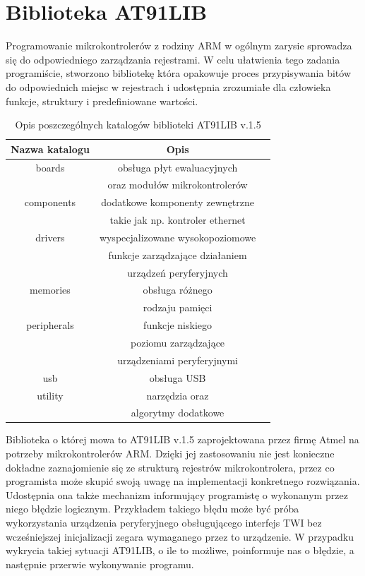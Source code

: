 \section{Biblioteka AT91LIB}
\label{sec:at91lib}
Programowanie mikrokontrolerów z rodziny ARM w ogólnym zarysie sprowadza się do odpowiedniego zarządzania rejestrami.  W celu ułatwienia tego zadania programiście, stworzono bibliotekę która opakowuje proces przypisywania bitów do odpowiednich miejsc w rejestrach i udostępnia zrozumiałe dla człowieka funkcje, struktury i predefiniowane wartości. 

\begin{table}[!ht]
\centering
\caption{Opis poszczególnych katalogów biblioteki AT91LIB v.1.5}
   	\begin{tabular}{ | c | c | p{1.75cm} |} \hline
   		Nazwa katalogu & Opis \\ \hline
   		boards & obsługa płyt ewaluacyjnych \\
		 & oraz modułów mikrokontrolerów \\ \hline
   		components & dodatkowe komponenty zewnętrzne \\
		 & takie jak np. kontroler ethernet \\ \hline
		drivers & wyspecjalizowane wysokopoziomowe \\ 
		 & funkcje zarządzające działaniem \\
		 & urządzeń peryferyjnych \\ \hline
		memories & obsługa różnego \\ 
		 & rodzaju pamięci \\ \hline
		peripherals & funkcje niskiego \\
		 & poziomu zarządzające \\ 
		 & urządzeniami peryferyjnymi \\ \hline
		usb & obsługa USB \\ \hline
		utility & narzędzia oraz \\ 
		 & algorytmy dodatkowe \\ \hline
   	\end{tabular}
\label{tab:AT91LIB}
\end{table}

Biblioteka o której mowa to AT91LIB\cite{AT91LIB} v.1.5 zaprojektowana przez firmę Atmel na potrzeby mikrokontrolerów ARM. Dzięki jej zastosowaniu nie jest konieczne dokładne zaznajomienie się ze strukturą rejestrów mikrokontrolera, przez co programista może skupić swoją uwagę na implementacji konkretnego rozwiązania. Udostępnia ona także mechanizm informujący programistę o wykonanym przez niego błędzie logicznym. Przykładem takiego błędu może być próba wykorzystania urządzenia peryferyjnego obsługującego interfejs TWI bez wcześniejszej inicjalizacji zegara wymaganego przez to urządzenie. W przypadku wykrycia takiej sytuacji AT91LIB, o ile to możliwe, poinformuje nas o błędzie, a następnie przerwie wykonywanie programu.

